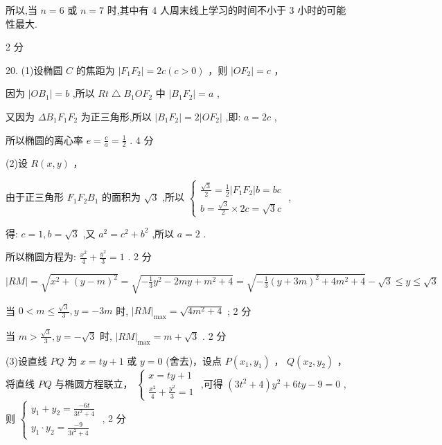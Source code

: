 \documentclass[10pt]{article}
\begin{document}
所以,当 \(n = 6\) 或 \(n = 7\) 时,其中有 4 人周末线上学习的时间不小于 3 小时的可能性最大.

2 分

20. (1)设椭圆 \(C\) 的焦距为 \(\left| {{F}_{1}{F}_{2}}\right|  = {2c}\left( {c > 0}\right)\) ，则 \(\left| {O{F}_{2}}\right|  = c\) ，

因为 \(\left| {O{B}_{1}}\right|  = b\) ,所以 \({Rt}\bigtriangleup {B}_{1}O{F}_{2}\) 中 \(\left| {{B}_{1}{F}_{2}}\right|  = a\) ,

又因为 \(\Delta {B}_{1}{F}_{1}{F}_{2}\) 为正三角形,所以 \(\left| {{B}_{1}{F}_{2}}\right|  = 2\left| {O{F}_{2}}\right|\) ,即: \(a = {2c}\) ,

所以椭圆的离心率 \(e = \frac{c}{a} = \frac{1}{2}\) . 4 分

(2)设 \(R\left( {x,y}\right)\) ，

由于正三角形 \({F}_{1}{F}_{2}{B}_{1}\) 的面积为 \(\sqrt{3}\) ,所以 \(\left\{  \begin{array}{l} \frac{\sqrt{3}}{2} = \frac{1}{2}\left| {{F}_{1}{F}_{2}}\right| b = {bc} \\  b = \frac{\sqrt{3}}{2} \times  {2c} = \sqrt{3}c \end{array}\right.\) ,

得: \(c = 1,b = \sqrt{3}\) ,又 \({a}^{2} = {c}^{2} + {b}^{2}\) ,所以 \(a = 2\) .

所以椭圆方程为: \(\frac{{x}^{2}}{4} + \frac{{y}^{2}}{3} = 1\) . 2 分

\(\left| {RM}\right|  = \sqrt{{x}^{2} + {\left( y - m\right) }^{2}} = \sqrt{-\frac{1}{3}{y}^{2} - {2my} + {m}^{2} + 4} = \sqrt{-\frac{1}{3}{\left( y + 3m\right) }^{2} + 4{m}^{2} + 4} - \sqrt{3} \leq  y \leq  \sqrt{3}\)

当 \(0 < m \leq  \frac{\sqrt{3}}{3},y =  - {3m}\) 时, \({\left| RM\right| }_{\max } = \sqrt{4{m}^{2} + 4}\) ; 2 分

当 \(m > \frac{\sqrt{3}}{3},y =  - \sqrt{3}\) 时, \({\left| RM\right| }_{\max } = m + \sqrt{3}\) . 2 分

(3)设直线 \({PQ}\) 为 \(x = {ty} + 1\) 或 \(y = 0\) (舍去)，设点 \(P\left( {{x}_{1},{y}_{1}}\right)\) ， \(Q\left( {{x}_{2},{y}_{2}}\right)\) ，将直线 \({PQ}\) 与椭圆方程联立， \(\left\{  \begin{array}{l} x = {ty} + 1 \\  \frac{{x}^{2}}{4} + \frac{{y}^{2}}{3} = 1 \end{array}\right.\) ,可得 \(\left( {3{t}^{2} + 4}\right) {y}^{2} + {6ty} - 9 = 0\) ,则 \(\left\{  \begin{array}{l} {y}_{1} + {y}_{2} = \frac{-{6t}}{3{t}^{2} + 4} \\  {y}_{1} \cdot  {y}_{2} = \frac{-9}{3{t}^{2} + 4} \end{array}\right.\) , 2 分
\end{document}
